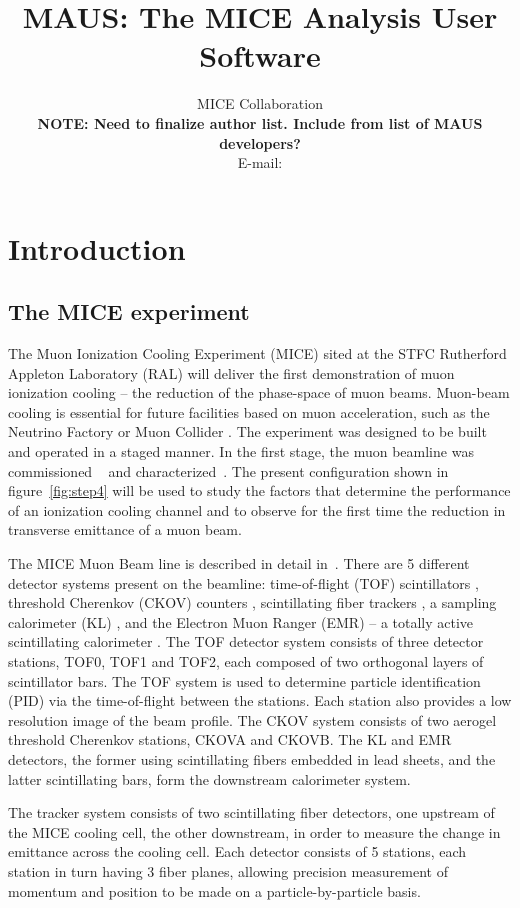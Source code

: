 \documentclass{JINST}
\title{MAUS: The MICE Analysis User Software}
\author{MICE Collaboration \\ {\bf NOTE: Need to finalize author list. Include from list of MAUS developers?}
\\
E-mail: \email{durga@fnal.gov}}
\begin{document}
\linenumbers

\section{Introduction}\label{sec:intro}

\subsection{The MICE experiment} \label{sec:mice}
The Muon Ionization Cooling Experiment (MICE) sited at the STFC Rutherford Appleton Laboratory (RAL) will deliver the first demonstration of muon ionization cooling -- the reduction of the phase-space of muon beams. Muon-beam cooling is essential for future facilities based on muon acceleration, such as the Neutrino Factory or Muon Collider \cite{IDR, MC_Overview}. The experiment was designed to be built and operated in a staged manner. In the first stage, the muon beamline was commissioned  ~\cite{BeamlineJINST} and characterized~\cite{BeamCharacterisationEurPhysJ}. The present configuration shown in figure~\ref{fig:step4} will be used to study the factors that determine the performance of an ionization cooling channel and to observe for the first time the reduction in transverse emittance of a muon beam.

The MICE Muon Beam line is described in detail in~\cite{BeamlineJINST}. There are 5 different detector systems present on the beamline: time-of-flight (TOF) scintillators \cite{NIMA_TOF}, threshold Cherenkov (CKOV) counters \cite{CkovIEEE}, scintillating fiber trackers \cite{TrackersNIM}, a sampling calorimeter (KL) \cite{BeamCharacterisationEurPhysJ}, and the Electron Muon Ranger (EMR) -- a totally active scintillating calorimeter \cite{EMRJINST11}. The TOF detector system consists of three detector stations, TOF0, TOF1 and TOF2, each composed of two orthogonal layers of scintillator bars. The TOF system is used to determine particle identification (PID) via the time-of-flight between the stations. Each station also provides a low resolution image of the beam profile.  The CKOV system consists of two aerogel threshold Cherenkov stations, CKOVA and CKOVB. The KL and EMR detectors, the former using scintillating fibers embedded in lead sheets, and the latter scintillating bars, form the downstream calorimeter system.

The tracker system consists of two scintillating fiber detectors, one upstream of the MICE cooling cell, the other downstream, in order to measure the change in emittance across the cooling cell. Each detector consists of 5 stations, each station in turn having 3 fiber planes, allowing precision measurement of momentum and position to be made on a particle-by-particle basis.
\end{document}
